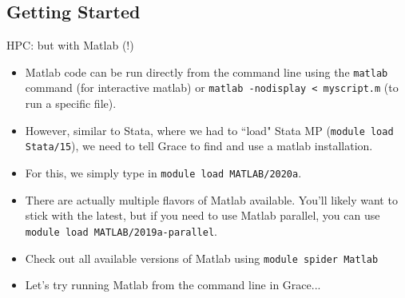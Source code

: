 \documentclass[10pt,xcolor={svgnames}]{beamer}
\begin{document}
\subsection{Getting Started}

\begin{frame}{HPC: but with Matlab (!)}
\begin{itemize}
\item Matlab code can be run directly from the command line using the \texttt{matlab} command (for interactive matlab) or \texttt{matlab -nodisplay < myscript.m} (to run a specific file).
\item However, similar to Stata, where we had to ``load" Stata MP (\texttt{module load Stata/15}), we need to tell Grace to find and use a matlab installation.
\item For this, we simply type in \texttt{module load MATLAB/2020a}.
\item There are actually multiple flavors of Matlab available. You'll likely want to stick with the latest, but if you need to use Matlab parallel, you can use \texttt{module load MATLAB/2019a-parallel}.
\item Check out all available versions of Matlab using \texttt{module spider Matlab}
\item Let's try running Matlab from the command line in Grace...
\end{itemize}
\end{frame}
\end{document}
